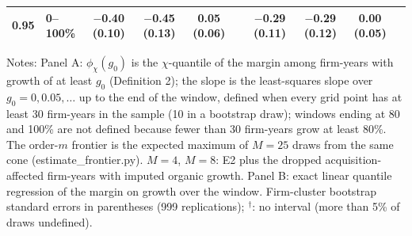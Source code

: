 \begin{table}[t]
{\begin{tabular}{llcccccccc}
0.95 & 0--100\% & $-$0.40 (0.10) & $-$0.45 (0.13) & 0.05 (0.06) & & $-$0.29 (0.11) & $-$0.29 (0.12) & 0.00 (0.05) & \\
\bottomrule\end{tabular}}
\par\vspace{2pt}\footnotesize\raggedright Notes: Panel A: $\phi_\chi(g_0)$ is the $\chi$-quantile of the margin among firm-years with growth of at least $g_0$ (Definition 2); the slope is the least-squares slope over $g_0=0,0.05,\dots$ up to the end of the window, defined when every grid point has at least 30 firm-years in the sample (10 in a bootstrap draw); windows ending at 80 and 100\% are not defined because fewer than 30 firm-years grow at least 80\%. The order-$m$ frontier is the expected maximum of $M=25$ draws from the same cone (estimate\_frontier.py). $M=4$, $M=8$: E2 plus the dropped acquisition-affected firm-years with imputed organic growth. Panel B: exact linear quantile regression of the margin on growth over the window. Firm-cluster bootstrap standard errors in parentheses (999 replications); $^\dagger$: no interval (more than 5\% of draws undefined).
\end{table}